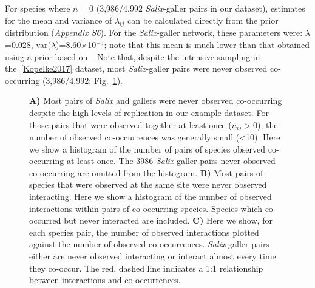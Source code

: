 \documentclass[12pt]{article}
\begin{document}
      For species where $n=0$ (3,986/4,992 \emph{Salix}-galler pairs in our dataset), estimates for the mean and variance of $\lambda_{ij}$ can be calculated directly from the prior distribution (\emph{Appendix S6}). For the \emph{Salix}-galler network, these parameters were: $\bar\lambda$=0.028, var($\lambda$)=8.60$\times$10$^{-5}$; note that this mean is much lower than that obtained using a prior based on~\citet[Data available from the Dryad Digital Repository: https://doi.org/10.5061/dryad.g7805]{Barbour2016}. Note that, despite the intensive sampling in the~\ref{Kopelke2017} dataset, most \emph{Salix}-galler pairs were never observed co-occurring (3,986/4,992; Fig.~\ref{histograms}).


      \begin{figure}[h!]
          \caption{\textbf{A)} Most pairs of \emph{Salix} and gallers were never observed co-occurring despite the high levels of replication in our example dataset. For those pairs that were observed together at least once ($n_{ij}>0$), the number of observed co-occurrences was generally small (\textless10). Here we show a histogram of the number of pairs of species observed co-occurring at least once. The 3986 \emph{Salix}-galler pairs never observed co-occurring are omitted from the histogram. \textbf{B)} Most pairs of species that were observed at the same site were never observed interacting. Here we show a histogram of the number of observed interactions within pairs of co-occurring species. Species which co-occurred but never interacted are included. \textbf{C)} Here we show, for each species pair, the number of observed interactions plotted against the number of observed co-occurrences. \emph{Salix}-galler pairs either are never observed interacting or interact almost every time they co-occur. The red, dashed line indicates a 1:1 relationship between interactions and co-occurrences.}
          \label{histograms}
          \begin{center}

\end{center}
\end{figure}
\end{document}
